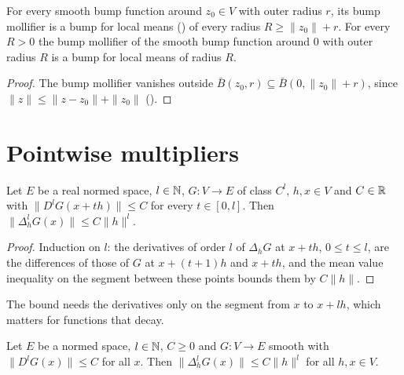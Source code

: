 \begin{lemma}
\label{lem:bump-of-smooth-bump}
\leanok
{}
For every smooth bump function around $z_0 \in V$ with outer radius $r$, its bump mollifier is a
bump for local means () of every radius $R \geq \|z_0\| + r$. For every
$R > 0$ the bump mollifier of the smooth bump function around $0$ with outer radius $R$ is a bump
for local means of radius $R$.
\end{lemma}

\begin{proof}
\leanok
The bump mollifier vanishes outside $\bar B(z_0, r) \subseteq \bar B(0, \|z_0\| + r)$, since
$\|z\| \leq \|z - z_0\| + \|z_0\|$ ().
\end{proof}

\section{Pointwise multipliers}

\begin{lemma}
\label{lem:differences-segment}
\leanok
{}
Let $E$ be a real normed space, $l \in \mathbb{N}$, $G : V \to E$ of class $C^l$, $h, x \in V$ and
$C \in \mathbb{R}$ with $\|D^l G(x + t h)\| \leq C$ for every $t \in [0, l]$. Then
$\|\Delta_h^l G(x)\| \leq C \|h\|^l$.
\end{lemma}

\begin{proof}
\leanok
Induction on $l$: the derivatives of order $l$ of $\Delta_h G$ at $x + t h$, $0 \leq t \leq l$,
are the differences of those of $G$ at $x + (t + 1) h$ and $x + t h$, and the mean value
inequality on the segment between these points bounds them by $C \|h\|$.
\end{proof}

The bound needs the derivatives only on the segment from $x$ to $x + l h$, which matters for
functions that decay.

\begin{lemma}
\label{lem:smooth-differences}
\leanok
{}
Let $E$ be a normed space, $l \in \mathbb{N}$, $C \geq 0$ and $G : V \to E$ smooth with
$\|D^l G(x)\| \leq C$ for all $x$. Then $\|\Delta_h^l G(x)\| \leq C \|h\|^l$ for all $h, x \in V$.
\end{lemma}

